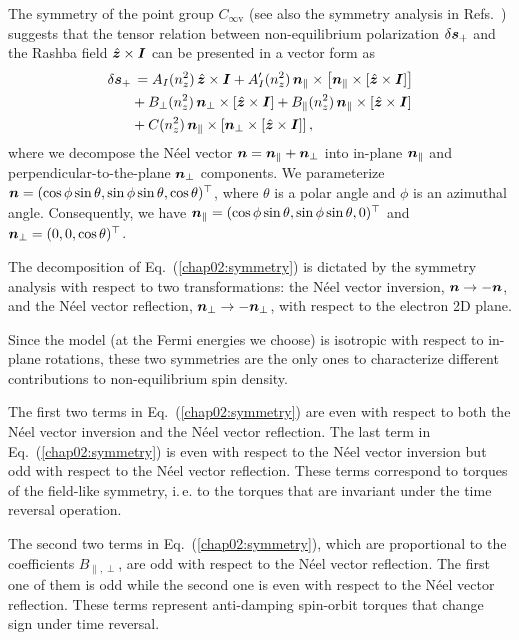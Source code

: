 The symmetry of the point group $C_{\infty\textrm{v}}$ (see also the symmetry analysis in Refs.~\cite{vanderBijl2012, garello_symmetry_2013}) suggests that the tensor relation between non-equilibrium polarization $\delta\boldsymbol{s}_+$ and the Rashba field $\hat{\boldsymbol{z}}\times \boldsymbol{I}$ can be presented in a vector form as 
\begin{align}
\delta\boldsymbol{s}_+&\,= A_I(n_z^2)\,\hat{\boldsymbol{z}}\times \boldsymbol{I} + A'_I(n_z^2)\,\boldsymbol{n}_\parallel\times \left[\boldsymbol{n}_\parallel\times \left[\hat{\boldsymbol{z}}\times \boldsymbol{I}\right]\right]\nonumber\\
&+ B_\perp(n_z^2)\,\boldsymbol{n}_\perp\times \left[\hat{\boldsymbol{z}}\times \boldsymbol{I}\right]+B_\parallel(n_z^2)\,\boldsymbol{n}_\parallel\times \left[\hat{\boldsymbol{z}}\times \boldsymbol{I}\right]\nonumber\\
&+ C(n_z^2)\,\boldsymbol{n}_\parallel\times \left[\boldsymbol{n}_\perp\times \left[\hat{\boldsymbol{z}}\times \boldsymbol{I}\right]\right],
\label{chap02:symmetry}
\end{align}
where we decompose the N\'eel vector $\boldsymbol{n}=\boldsymbol{n}_\parallel+\boldsymbol{n}_\perp$ into in-plane $\boldsymbol{n}_\parallel$ and perpendicular-to-the-plane $\boldsymbol{n}_\perp$ components. We parameterize $\boldsymbol{n}=(\cos\phi\sin\theta,\allowbreak \sin\phi\sin\theta, \allowbreak \cos\theta)^\top$, where $\theta$ is a polar angle and $\phi$ is an azimuthal angle. Consequently, we have $\boldsymbol{n}_\parallel=(\cos\phi\sin\theta,\sin\phi\sin\theta,0)^\top$ and $\boldsymbol{n}_\perp=(0,0,\cos\theta)^\top$.

The decomposition of Eq.~(\ref{chap02:symmetry}) is dictated by the symmetry analysis with respect to two transformations: the N\'eel vector inversion, $\boldsymbol{n}\to -\boldsymbol{n}$, and the N\'eel vector reflection, $\boldsymbol{n}_\perp\to -\boldsymbol{n}_\perp$, with respect to the electron 2D plane. 

Since the model (at the Fermi energies we choose) is isotropic with respect to in-plane rotations, these two symmetries are the only ones to characterize different contributions to non-equilibrium spin density. 

The first two terms in Eq.~(\ref{chap02:symmetry}) are even with respect to both the N\'eel vector inversion and the N\'eel vector reflection. The last term in Eq.~(\ref{chap02:symmetry}) is even with respect to the N\'eel vector inversion but odd with respect to the N\'eel vector reflection. These terms correspond to torques of the field-like symmetry, i.\,e. to the torques that are invariant under the time reversal operation. 

The second two terms in Eq.~(\ref{chap02:symmetry}), which are proportional to the coefficients $B_{\parallel,\perp}$, are odd with respect to the N\'eel vector reflection. The first one of them is odd while the second one is even with respect to the N\'eel vector reflection. These terms represent anti-damping spin-orbit torques that change sign under time reversal.

